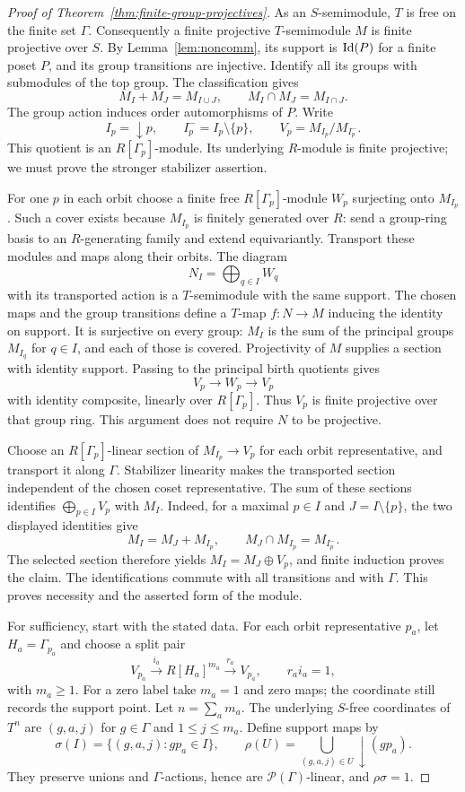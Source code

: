 \begin{proof}[Proof of Theorem~\ref{thm:finite-group-projectives}]
As an $S$-semimodule, $T$ is free on the finite set $\Gamma$.
Consequently a finite projective $T$-semimodule $M$ is finite projective
over $S$. By Lemma~\ref{lem:noncomm}, its support is $\operatorname{Id}(P)$ for a
finite poset $P$, and its group transitions are injective. Identify all
its groups with submodules of the top group. The classification gives
\[
 M_I+M_J=M_{I\cup J},\qquad M_I\cap M_J=M_{I\cap J}.
\]
The group action induces order automorphisms of $P$. Write
\[
 I_p=\downarrow p,\qquad I_p^-=I_p\setminus\{p\},\qquad
 V_p=M_{I_p}/M_{I_p^-}.
\]
This quotient is an $R[\Gamma_p]$-module. Its underlying $R$-module
is finite projective; we must prove the stronger stabilizer assertion.

For one $p$ in each orbit choose a finite free $R[\Gamma_p]$-module
$W_p$ surjecting onto $M_{I_p}$. Such a cover exists because $M_{I_p}$
is finitely generated over $R$: send a group-ring basis to an
$R$-generating family and extend equivariantly. Transport these modules
and maps along their orbits. The diagram
\[
 N_I=\bigoplus_{q\in I}W_q
\]
with its transported action is a $T$-semimodule with the same support.
The chosen maps and the group transitions define a $T$-map $f:N\to M$
inducing the identity on support. It is surjective on every group:
$M_I$ is the sum of the principal groups $M_{I_q}$ for $q\in I$,
and each of those is covered. Projectivity of $M$ supplies a section
with identity support. Passing to the principal birth quotients gives
\[
 V_p\longrightarrow W_p\longrightarrow V_p
\]
with identity composite, linearly over $R[\Gamma_p]$. Thus $V_p$ is
finite projective over that group ring. This argument does not require
$N$ to be projective.

Choose an $R[\Gamma_p]$-linear section of $M_{I_p}\to V_p$ for each
orbit representative, and transport it along $\Gamma$. Stabilizer
linearity makes the transported section independent of the chosen
coset representative. The sum of these sections identifies
$\bigoplus_{p\in I}V_p$ with $M_I$. Indeed, for a maximal $p\in I$
and $J=I\setminus\{p\}$, the two displayed identities give
\[
 M_I=M_J+M_{I_p},\qquad
 M_J\cap M_{I_p}=M_{I_p^-}.
\]
The selected section therefore yields $M_I=M_J\oplus V_p$, and finite
induction proves the claim. The identifications commute with all
transitions and with $\Gamma$. This proves necessity and the asserted
form of the module.

For sufficiency, start with the stated data. For each orbit representative
$p_a$, let $H_a=\Gamma_{p_a}$ and choose a split pair
\[
 V_{p_a}\xrightarrow{i_a}R[H_a]^{m_a}
 \xrightarrow{r_a}V_{p_a},\qquad r_ai_a=1,
\]
with $m_a\ge1$. For a zero label take $m_a=1$ and zero maps; the
coordinate still records the support point. Let $n=\sum_a m_a$.
The underlying $S$-free coordinates of $T^n$ are $(g,a,j)$ for
$g\in\Gamma$ and $1\le j\le m_a$. Define support maps by
\[
 \sigma(I)=\{(g,a,j):gp_a\in I\},\qquad
 \rho(U)=\bigcup_{(g,a,j)\in U}\downarrow(gp_a).
\]
They preserve unions and $\Gamma$-actions, hence are
$\mathcal P(\Gamma)$-linear, and $\rho\sigma=1$.


\end{proof}
